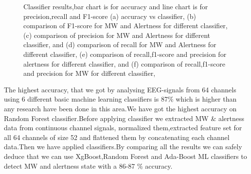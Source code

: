 \begin{figure}
    \centering
    \caption{Classifier results,bar chart is for accuracy and line chart is for precision,recall and F1-score (a) accuracy vs classifier, (b) comparison of F1-score  for MW and Alertness for different classifier, (c) comparison of precision  for MW and Alertness for different classifier, and (d) comparison of recall  for MW and Alertness for different classifier,  (e) comparison of recall,f1-score and precision for alertness for different classifier, and (f)  comparison of recall,f1-score and precision for MW for different classifier,  }
    \label{fig:test_score}
\end{figure}


The highest accuracy, that we got by analysing EEG-signals from 64 channels using 6 different basic machine learning  classifiers is 87\% which is higher than any research have been done in this area.We have got the highest accuracy on Random Forest classifier.Before applying classifier we extracted MW \& alertness data from continuous channel signals, normalized them,extracted feature set for all 64 channels of size 52 and flattened them by concatenating each channel data.Then we have applied classifiers.By comparing all the results we can safely deduce that we can use XgBoost,Random Forest and Ada-Boost ML classifiers to detect MW and alertness state with a 86-87 \% accuracy.
